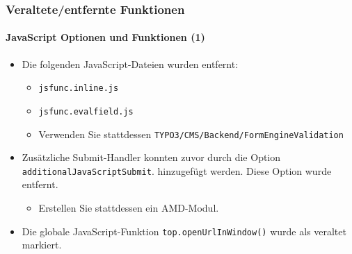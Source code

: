\begin{frame}[fragile]
	\frametitle{Veraltete/entfernte Funktionen}
	\framesubtitle{JavaScript Optionen und Funktionen (1)}

	\begin{itemize}
		\item Die folgenden JavaScript-Dateien wurden entfernt:

			\begin{itemize}
				\item \texttt{jsfunc.inline.js}
				\item \texttt{jsfunc.evalfield.js}
			\end{itemize}

			\begin{itemize}\smaller
				\item[\ding{228}] Verwenden Sie stattdessen \texttt{TYPO3/CMS/Backend/FormEngineValidation} 
			\end{itemize}\normalsize

		\item Zusätzliche Submit-Handler konnten zuvor durch die Option  \texttt{additionalJavaScriptSubmit}.
			hinzugefügt werden. Diese Option wurde entfernt.

			\begin{itemize}\smaller
				\item[\ding{228}] Erstellen Sie stattdessen ein AMD-Modul.
			\end{itemize}\normalsize

		\item Die globale JavaScript-Funktion \texttt{top.openUrlInWindow()} wurde als veraltet markiert.

	\end{itemize}

\end{frame}


